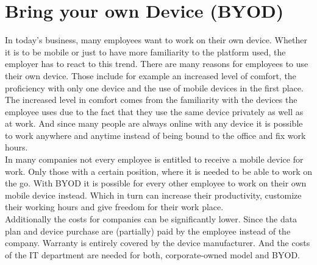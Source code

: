 \chapter{Bring your own Device (BYOD)}
In today's business, many employees want to work on their own device. Whether it is to be mobile or just to have more familiarity to the platform used, the employer has to react to this trend. There are many reasons for employees to use their own device. Those include for example an increased level of comfort, the proficiency with only one device and the use of mobile devices in the first place. \\
The increased level in comfort comes from the familiarity with the devices the employee uses due to the fact that they use the same device privately as well as at work. And since many people are always online with any device it is possible to work anywhere and anytime instead of being bound to the office and fix work hours. \\
In many companies not every employee is entitled to receive a mobile device for work. Only those with a certain position, where it is needed to be able to work on the go. With BYOD it is possible for every other employee to work on their own mobile device instead. Which in turn can increase their productivity, customize their working hours and give freedom for their work place.\\
Additionally the costs for companies can be significantly lower. Since the data plan and device purchase are (partially) paid by the employee instead of the company. Warranty is entirely covered by the device manufacturer. And the costs of the IT department are needed for both, corporate-owned model and BYOD. \parencite{IBMSecurity.2016}


